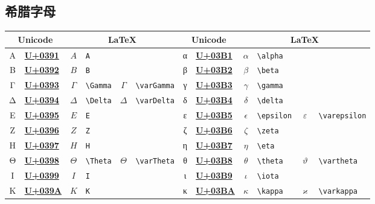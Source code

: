 \documentclass{ctexbook}
\newcommand{\rrun}[1]{\colorbox{Mulberry}{\href{https://unicode-table.com/#1/}{\color{White}\ttfamily{}\bfseries{}U+#1}}}
\providecommand{\Unicode}{
	\ttfamily
	Unicode\textregistered
}
\begin{document}
\newpage
\subsection{希腊字母}

\begin{table}[h!]
	\centering
	\begin{tabular}{c@{ }l c@{ }l c@{ }l c@{ }l c@{ }l c@{ }l}
		\hline
		\multicolumn{2}{c}{\Unicode} & \multicolumn{4}{c}{\LaTeX{}} & \multicolumn{2}{c}{\Unicode} & \multicolumn{4}{c}{\LaTeX{}} \\
		\hline
		Α & \rrun{0391} &        $A$ & \verb|A|        &               &                    & α & \rrun{03B1} &   $\alpha$ & \verb|\alpha|   &               &                    \\
		Β & \rrun{0392} &        $B$ & \verb|B|        &               &                    & β & \rrun{03B2} &    $\beta$ & \verb|\beta|    &               &                    \\
		Γ & \rrun{0393} &   $\Gamma$ & \verb|\Gamma|   &   $\varGamma$ & \verb|\varGamma|   & γ & \rrun{03B3} &   $\gamma$ & \verb|\gamma|   &               &                    \\
		Δ & \rrun{0394} &   $\Delta$ & \verb|\Delta|   &   $\varDelta$ & \verb|\varDelta|   & δ & \rrun{03B4} &   $\delta$ & \verb|\delta|   &               &                    \\
		Ε & \rrun{0395} &        $E$ & \verb|E|        &               &                    & ε & \rrun{03B5} & $\epsilon$ & \verb|\epsilon| & $\varepsilon$ & \verb|\varepsilon| \\
		Ζ & \rrun{0396} &        $Z$ & \verb|Z|        &               &                    & ζ & \rrun{03B6} &    $\zeta$ & \verb|\zeta|    &               &                    \\
		Η & \rrun{0397} &        $H$ & \verb|H|        &               &                    & η & \rrun{03B7} &     $\eta$ & \verb|\eta|     &               &                    \\
		Θ & \rrun{0398} &   $\Theta$ & \verb|\Theta|   &   $\varTheta$ & \verb|\varTheta|   & θ & \rrun{03B8} &   $\theta$ & \verb|\theta|   &   $\vartheta$ & \verb|\vartheta|   \\
		Ι & \rrun{0399} &        $I$ & \verb|I|        &               &                    & ι & \rrun{03B9} &    $\iota$ & \verb|\iota|    &               &                    \\
		Κ & \rrun{039A} &        $K$ & \verb|K|        &               &                    & κ & \rrun{03BA} &   $\kappa$ & \verb|\kappa|   &   $\varkappa$ & \verb|\varkappa|   \\

\end{tabular}
\end{table}
\end{document}
